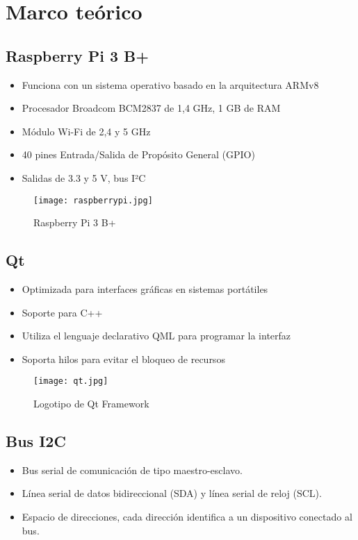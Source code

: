 \section{Marco teórico}

\subsection*{Raspberry Pi 3 B+}
\begin{itemize}
	\item Funciona con un sistema operativo basado en la arquitectura ARMv8
	\item Procesador Broadcom BCM2837 de 1,4 GHz, 1 GB de RAM
	\item Módulo Wi-Fi de 2,4 y 5 GHz
	\item 40 pines Entrada/Salida de Propósito General (GPIO)
	\item Salidas de 3.3 y 5 V, bus I²C
\end{itemize}

\begin{figure}[htb]
	\centering
	\texttt{[image: raspberrypi.jpg]}
	\caption{Raspberry Pi 3 B+}
\end{figure}

\subsection*{Qt}
\begin{itemize}
	\item Optimizada para interfaces gráficas en sistemas portátiles
	\item Soporte para C++
	\item Utiliza el lenguaje declarativo QML para programar la interfaz
	\item Soporta hilos para evitar el bloqueo de recursos
\end{itemize}

\begin{figure}[htb]
	\centering
	\texttt{[image: qt.jpg]}
	\caption{Logotipo de Qt Framework}
\end{figure}

\subsection*{Bus I2C}
\begin{itemize}
	\item Bus serial de comunicación de tipo maestro-esclavo.
	\item Línea serial de datos bidireccional (SDA)  y línea serial de reloj (SCL).
	\item Espacio de direcciones, cada dirección identifica a un dispositivo conectado al bus.
\end{itemize}


